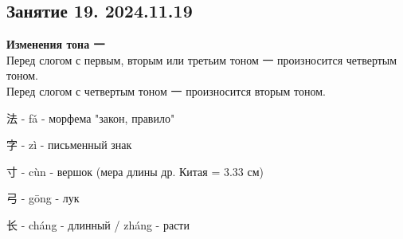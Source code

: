\LARGE
\newpage
\subsection{Занятие 19. 2024.11.19}
\textbf{Изменения тона 一}\\
Перед слогом с первым, вторым или третьим тоном 一 произносится четвертым тоном.\\
Перед слогом с четвертым тоном 一 произносится вторым тоном.
\begin{newgraphems}
	\item 法 - fǎ - морфема "закон, правило"
	\item 字 - zì - письменный знак
	\item 寸 - cùn - вершок (мера длины др. Китая = 3.33 см)
	\item 弓 - gōng - лук
	\item 长 - cháng - длинный / zháng - расти
\end{newgraphems}
